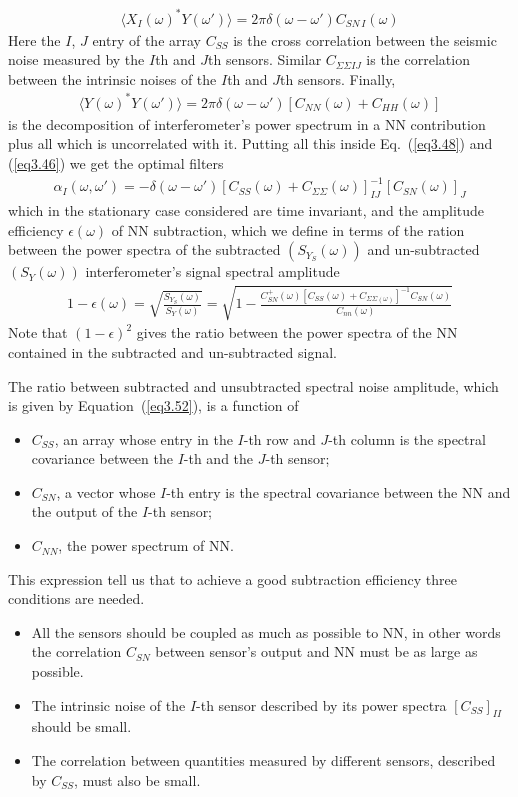 {\begin{eqnarray}
		\langle X_{I}(\omega)^{*}Y(\omega')\rangle=2\pi\delta(\omega-\omega')C_{SN\,I}(\omega)
		\label{eq3.49}
\end{eqnarray}
Here the $I$, $J$ entry of the array $C_{SS}$ is the cross correlation between the seismic noise measured by the $I$th and $J$th sensors. Similar $C_{\Sigma\Sigma IJ}$ is the correlation between the intrinsic noises of the $I$th and $J$th sensors. Finally,
\begin{eqnarray}
		\langle Y(\omega)^{*}Y(\omega')\rangle=2\pi\delta(\omega-\omega')[C_{NN}(\omega)+C_{HH}(\omega)]
		\label{eq3.50}
\end{eqnarray}
is the decomposition of interferometer's power spectrum in a NN contribution plus all which is uncorrelated with it. Putting all this inside Eq.~(\ref{eq3.48}) and (\ref{eq3.46}) we get the optimal filters
\begin{eqnarray}
		\alpha_{I}(\omega,\omega')=-\delta(\omega-\omega')[C_{SS}(\omega)+C_{\Sigma\Sigma}(\omega)]^{-1}_{IJ}[C_{SN}(\omega)]_{J}
		\label{eq3.51}
\end{eqnarray}
which in the stationary case considered are time invariant, and the amplitude efficiency $\epsilon(\omega)$ of NN subtraction, which we define in terms of the ration between the power spectra of the subtracted $(S_{Y_{S}}(\omega))$ and un-subtracted $(S_{Y}(\omega))$ interferometer's signal spectral amplitude 
\begin{eqnarray}
		1-\epsilon(\omega)=\sqrt{\frac{S_{Y_{S}}(\omega)}{S_{Y}(\omega)}}=\sqrt{1-\frac{C^{+}_{SN}(\omega)[C_{SS}(\omega)+C_{\Sigma\Sigma(\omega)}]^{-1}C_{SN}(\omega)}{C_{nn}(\omega)}}
		\label{eq3.52}
\end{eqnarray}
Note that $(1-\epsilon)^{2}$ gives the ratio between the power spectra of the NN contained in the subtracted and un-subtracted signal. 
}

The ratio between subtracted and unsubtracted spectral noise amplitude, which is
given by Equation~(\ref{eq3.52}), is a function of 
\begin{itemize}
\item $C_{SS}$, an array whose entry in the $I$-th row and $J$-th column is
the spectral covariance between the $I$-th and the $J$-th sensor;
\item $C_{SN}$, a vector whose $I$-th entry is the spectral covariance between
the NN and the output of the $I$-th sensor;
\item $C_{NN}$, the power spectrum of NN.
\end{itemize}
This expression tell us that to achieve a good subtraction efficiency three
conditions are needed.
\begin{itemize}
\item All the sensors should be coupled as much as possible to NN, in other
words the correlation $C_{SN}$ between sensor's output and NN must be as large
as possible.
\item The intrinsic noise of the $I$-th sensor described by its power spectra
$[C_{SS}]_{II}$ should be small.
\item The correlation between quantities measured by different sensors,
described by $C_{SS}$, must also be small.
\end{itemize}

